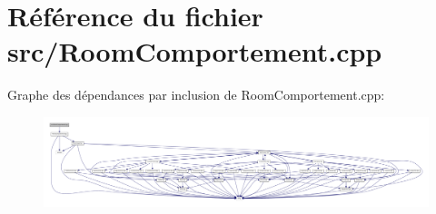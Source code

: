 \section{Référence du fichier src/\-Room\-Comportement.cpp}
\label{_room_comportement_8cpp}
Graphe des dépendances par inclusion de Room\-Comportement.\-cpp\-:\nopagebreak
\begin{figure}[H]
\begin{center}
\leavevmode
\includegraphics[width=350pt]{_room_comportement_8cpp__incl}
\end{center}
\end{figure}

